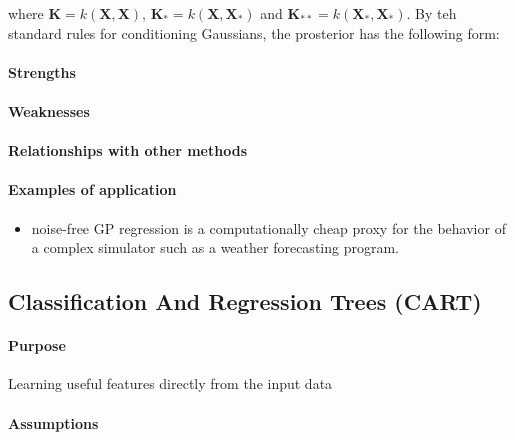 where $\bm{K}=k(\bm{X},\bm{X})$, $\bm{K}_{*}=k(\bm{X},\bm{X}_{*})$ and $\bm{K}_{**}=k(\bm{X}_{*},
\bm{X}_{*})$. By teh standard rules for conditioning Gaussians, the prosterior has the following 
form:


\paragraph{Strengths}
\paragraph{Weaknesses}
\paragraph{Relationships with other methods}
\paragraph{Examples of application}
\begin{itemize}
    \item noise-free GP regression is a computationally cheap proxy for the behavior
        of a complex simulator such as a weather forecasting program.
\end{itemize}




\subsection{Classification And Regression Trees (CART)}
\paragraph{Purpose}
Learning useful features directly from the input data
\paragraph{Assumptions}

